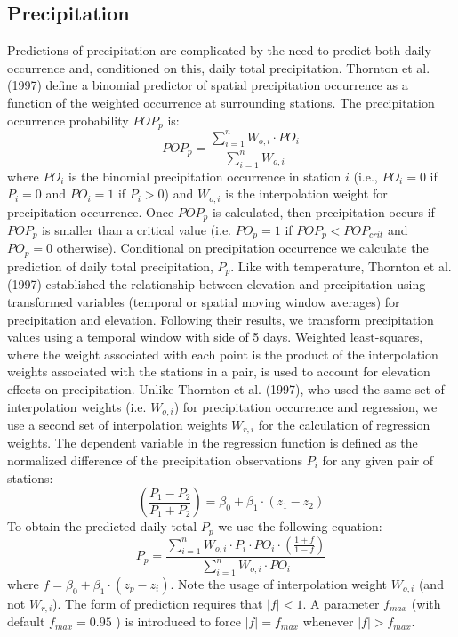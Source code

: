 \documentclass[11pt,a4paper]{article}
\begin{document}
\subsection{Precipitation}
Predictions of precipitation are complicated by the need to predict both daily occurrence and, conditioned on this, daily total precipitation. Thornton et al. (1997) define a binomial predictor of spatial precipitation occurrence as a function of the weighted occurrence at surrounding stations. The precipitation occurrence probability $POP_p$ is:
\begin{equation}
POP_p = \frac{\sum_{i=1}^{n}{W_{o,i}\cdot PO_i}}{\sum_{i=1}^{n}{W_{o,i}}}
\end{equation}
where $PO_i$ is the binomial precipitation occurrence in station $i$ (i.e., $PO_i = 0$ if $P_i = 0$ and $PO_i = 1$ if $P_i > 0$) and $W_{o,i}$ is the interpolation weight for precipitation occurrence. Once $POP_p$ is calculated, then precipitation occurs if $POP_p$ is smaller than a critical value (i.e. $PO_p = 1$ if $POP_p < POP_{crit}$ and $PO_p = 0$ otherwise). Conditional on precipitation occurrence we calculate the prediction of daily total precipitation, $P_p$. Like with temperature, Thornton et al. (1997) established the relationship between elevation and precipitation using transformed variables (temporal or spatial moving window averages) for precipitation and elevation. Following their results, we transform precipitation values using a temporal window with side of 5 days. Weighted least-squares, where the weight associated with each point is the product of the interpolation weights associated with the stations in a pair, is used to account for elevation effects on precipitation. Unlike Thornton et al. (1997), who used the same set of interpolation weights (i.e. $W_{o,i}$) for precipitation occurrence and regression, we use a second set of interpolation weights $W_{r,i}$ for the calculation of regression weights. The dependent variable in the regression function is defined as the normalized difference of the precipitation observations $P_i$ for any given pair of stations:
\begin{equation}
\left(\frac{P_1 - P_2}{P_1 + P_2}\right) = \beta_0 + \beta_1 \cdot (z_1 - z_2)
\end{equation}
To obtain the predicted daily total $P_p$ we use the following equation:
\begin{equation}
P_p = \frac{\sum_{i=1}^{n}{W_{o,i}\cdot P_i \cdot PO_i \cdot \left(\frac{1 + f}{1 - f} \right)}}{\sum_{i=1}^{n}{W_{o,i} \cdot PO_i}}
\end{equation}
where $f = \beta_0 + \beta_1 \cdot (z_p - z_i)$. Note the usage of interpolation weight $W_{o,i}$ (and not $W_{r,i}$). The form of prediction requires that $\lvert f \rvert < 1$. A parameter $f_{max}$ (with default $f_{max} = 0.95$ ) is introduced to force $\lvert f \rvert  = f_{max}$ whenever $\lvert f \rvert  > f_{max}$.
\end{document}
